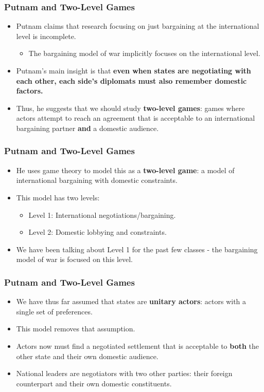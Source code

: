 \documentclass[handout]{beamer}
\begin{document}
\begin{frame} 
\frametitle{\LARGE{Putnam and Two-Level Games}}
	\begin{itemize}
		\item Putnam claims that research focusing on just bargaining at the international level is incomplete. \pause
		\begin{itemize}
			\item The bargaining model of war implicitly focuses on the international level. \pause
		\end{itemize}
		\item Putnam's main insight is that \textbf{even when states are negotiating with each other, each side's diplomats must also remember domestic factors.} \pause
		\item Thus, he suggests that we should study \textbf{two-level games}: games where actors attempt to reach an agreement that is acceptable to an international bargaining partner \textbf{and} a domestic audience.
	\end{itemize}
\end{frame}

\begin{frame} 
	\frametitle{\LARGE{Putnam and Two-Level Games}}
	\begin{itemize}
		\item He uses game theory to model this as a \textbf{two-level game}: a model of international bargaining with domestic constraints. \pause
		\item This model has two levels:
		\begin{itemize}
			\item Level 1: International negotiations/bargaining. \pause
			\item Level 2: Domestic lobbying and constraints. \pause
		\end{itemize}
		\item We have been talking about Level 1 for the past few classes - the bargaining model of war is focused on this level. 
	\end{itemize}
\end{frame}

\begin{frame} 
	\frametitle{\LARGE{Putnam and Two-Level Games}}
	\begin{itemize}
		\item We have thus far assumed that states are \textbf{unitary actors}: actors with a single set of preferences.
		\item This model removes that assumption. \pause
		\item Actors now must find a negotiated settlement that is acceptable to \textbf{both}  the other state and their own domestic audience. \pause
		\item National leaders are negotiators with two other parties: their foreign counterpart and their own domestic constituents. 
	\end{itemize}
\end{frame}
\end{document}
